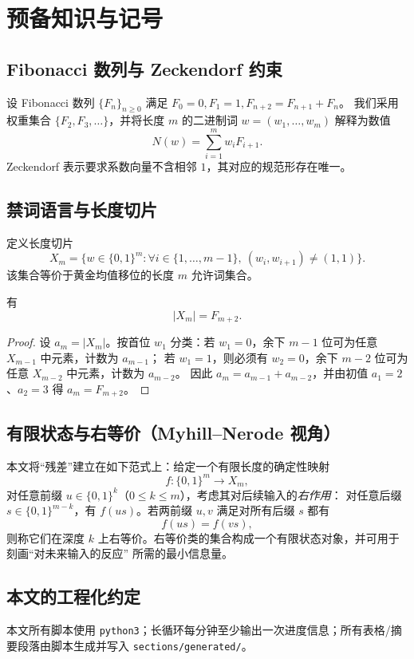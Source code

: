 \section{预备知识与记号}\label{sec:prelim}

\subsection{Fibonacci 数列与 Zeckendorf 约束}
设 Fibonacci 数列 $\{F_n\}_{n\ge 0}$ 满足 $F_0=0,F_1=1,F_{n+2}=F_{n+1}+F_n$。
我们采用权重集合 $\{F_2,F_3,\dots\}$，并将长度 $m$ 的二进制词 $w=(w_1,\dots,w_m)$ 解释为数值
\[
N(w)=\sum_{i=1}^{m} w_i F_{i+1}.
\]
Zeckendorf 表示要求系数向量不含相邻 $1$，其对应的规范形存在唯一。\cite{zeckendorf1972representation}

\subsection{禁词语言与长度切片}
定义长度切片
\[
X_m=\{w\in\{0,1\}^m:\forall i\in\{1,\dots,m-1\},\ (w_i,w_{i+1})\neq(1,1)\}.
\]
该集合等价于黄金均值移位的长度 $m$ 允许词集合。
\cite{lind1995symbolic}

\begin{theorem}[计数]\label{thm:Xm_count}
有
\[
|X_m|=F_{m+2}.
\]
\end{theorem}
\begin{proof}
设 $a_m=|X_m|$。按首位 $w_1$ 分类：若 $w_1=0$，余下 $m-1$ 位可为任意 $X_{m-1}$ 中元素，计数为 $a_{m-1}$；
若 $w_1=1$，则必须有 $w_2=0$，余下 $m-2$ 位可为任意 $X_{m-2}$ 中元素，计数为 $a_{m-2}$。
因此 $a_m=a_{m-1}+a_{m-2}$，并由初值 $a_1=2$、$a_2=3$ 得 $a_m=F_{m+2}$。
\end{proof}

\subsection{有限状态与右等价（Myhill--Nerode 视角）}
本文将“残差”建立在如下范式上：给定一个有限长度的确定性映射
\[
f:\{0,1\}^m\to X_m,
\]
对任意前缀 $u\in\{0,1\}^k$（$0\le k\le m$），考虑其对后续输入的\emph{右作用}：
对任意后缀 $s\in\{0,1\}^{m-k}$，有 $f(us)$。若两前缀 $u,v$ 满足对所有后缀 $s$ 都有
\[
f(us)=f(vs),
\]
则称它们在深度 $k$ 上右等价。右等价类的集合构成一个有限状态对象，并可用于刻画“对未来输入的反应”
所需的最小信息量。\cite{Myhill1957FiniteAutomata,Nerode1958Automata,HopcroftUllman1979Automata,Kozen1997Automata,Sipser2012TOC}

\subsection{本文的工程化约定}
本文所有脚本使用 \verb|python3|；长循环每分钟至少输出一次进度信息；所有表格/摘要段落由脚本生成并写入
\verb|sections/generated/|。


